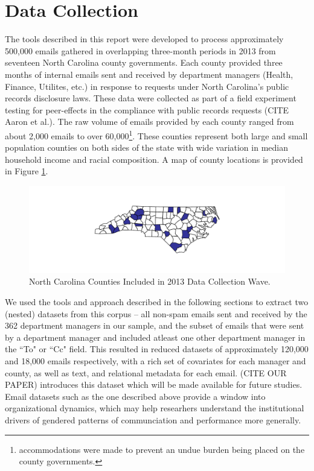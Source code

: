 \documentclass[fleqn]{MJDArticle}
\begin{document}
\section{Data Collection}


\noindent The tools described in this report were developed to process approximately 500,000 emails gathered in overlapping three-month periods in 2013 from seventeen North Carolina county governments. Each county provided three months of internal emails sent and received by department managers (Health, Finance, Utilites, etc.) in response to requests under North Carolina's public records disclosure laws. These data were collected as part of a field experiment testing for peer-effects in the compliance with public records requests (CITE Aaron et al.).  The raw volume of emails provided by each county ranged from about 2,000 emails to over 60,000\footnote{accommodations were made to prevent an undue burden being placed on the county governments.}. These counties represent both large and small population counties on both sides of the state with wide variation in median household income and racial composition. A map of county locations is provided in Figure \ref{fig:countyMap}. 

\begin{figure}[ht]
\centering
\caption{\label{fig:countyMap}North Carolina Counties Included in 2013 Data Collection Wave.}
\includegraphics[scale=1.5]{images/County_Map.pdf}
\end{figure}

\noindent We used the tools and approach described in the following sections to extract two (nested) datasets from this corpus -- all non-spam emails sent and received by the 362 department managers in our sample, and the subset of emails that were sent by a department manager and included atleast one other department manager in the ``To" or ``Cc" field. This resulted in reduced datasets of approximately 120,000 and 18,000 emails respectively, with a rich set of covariates for each manager and county, as well as text, and relational metadata for each email. (CITE OUR PAPER) introduces this dataset which will be made available for future studies. Email datasets such as the one described above provide a window into organizational dynamics, which may help researhers understand the institutional drivers of gendered patterns of communciation and performance more generally. 
\end{document}
